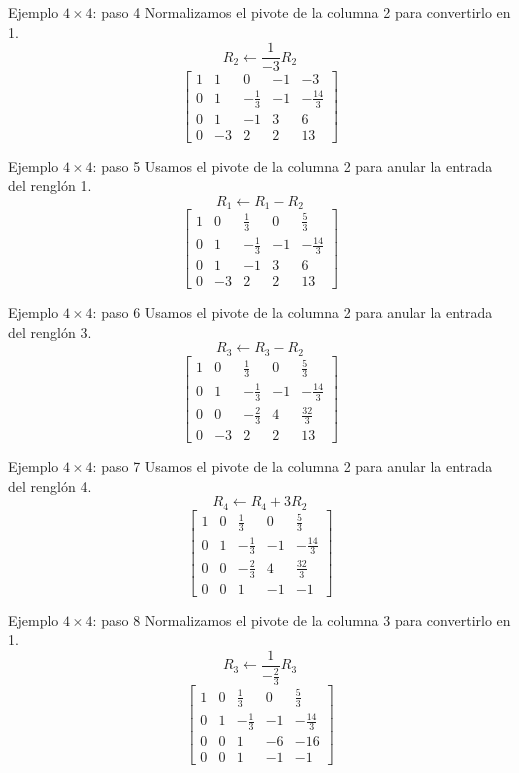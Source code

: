 \documentclass[aspectratio=169,9pt]{beamer}
\theoremstyle{remark}
\begin{document}
\begin{frame}[t]{Ejemplo $4\times4$: paso 4}
Normalizamos el pivote de la columna 2 para convertirlo en 1.
\[
R_{2}\leftarrow \frac{1}{-3}R_{2}
\]
\[
\left[\begin{array}{cccc|c}
1 & 1 & 0 & -1 & -3\\
0 & 1 & - \frac{1}{3} & -1 & - \frac{14}{3}\\
0 & 1 & -1 & 3 & 6\\
0 & -3 & 2 & 2 & 13
\end{array}\right]
\]
\end{frame}
\begin{frame}[t]{Ejemplo $4\times4$: paso 5}
Usamos el pivote de la columna 2 para anular la entrada del renglón 1.
\[
R_{1}\leftarrow R_{1}-R_{2}
\]
\[
\left[\begin{array}{cccc|c}
1 & 0 & \frac{1}{3} & 0 & \frac{5}{3}\\
0 & 1 & - \frac{1}{3} & -1 & - \frac{14}{3}\\
0 & 1 & -1 & 3 & 6\\
0 & -3 & 2 & 2 & 13
\end{array}\right]
\]
\end{frame}
\begin{frame}[t]{Ejemplo $4\times4$: paso 6}
Usamos el pivote de la columna 2 para anular la entrada del renglón 3.
\[
R_{3}\leftarrow R_{3}-R_{2}
\]
\[
\left[\begin{array}{cccc|c}
1 & 0 & \frac{1}{3} & 0 & \frac{5}{3}\\
0 & 1 & - \frac{1}{3} & -1 & - \frac{14}{3}\\
0 & 0 & - \frac{2}{3} & 4 & \frac{32}{3}\\
0 & -3 & 2 & 2 & 13
\end{array}\right]
\]
\end{frame}
\begin{frame}[t]{Ejemplo $4\times4$: paso 7}
Usamos el pivote de la columna 2 para anular la entrada del renglón 4.
\[
R_{4}\leftarrow R_{4}+3R_{2}
\]
\[
\left[\begin{array}{cccc|c}
1 & 0 & \frac{1}{3} & 0 & \frac{5}{3}\\
0 & 1 & - \frac{1}{3} & -1 & - \frac{14}{3}\\
0 & 0 & - \frac{2}{3} & 4 & \frac{32}{3}\\
0 & 0 & 1 & -1 & -1
\end{array}\right]
\]
\end{frame}
\begin{frame}[t]{Ejemplo $4\times4$: paso 8}
Normalizamos el pivote de la columna 3 para convertirlo en 1.
\[
R_{3}\leftarrow \frac{1}{- \frac{2}{3}}R_{3}
\]
\[
\left[\begin{array}{cccc|c}
1 & 0 & \frac{1}{3} & 0 & \frac{5}{3}\\
0 & 1 & - \frac{1}{3} & -1 & - \frac{14}{3}\\
0 & 0 & 1 & -6 & -16\\
0 & 0 & 1 & -1 & -1
\end{array}\right]
\]
\end{frame}
\end{document}
